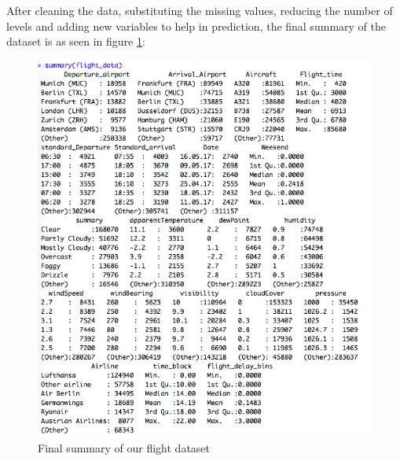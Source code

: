 After cleaning the data, substituting the missing values, reducing the number of levels and adding new variables to help in prediction, the final summary of the dataset is as seen in figure \ref{fig:summary_flights}:

\begin{figure}[ht]
    \centering
    \includegraphics[width=\textwidth]{Figures/summary_flight_data.png}
    \caption{Final summary of our flight dataset}
    \label{fig:summary_flights}
\end{figure}